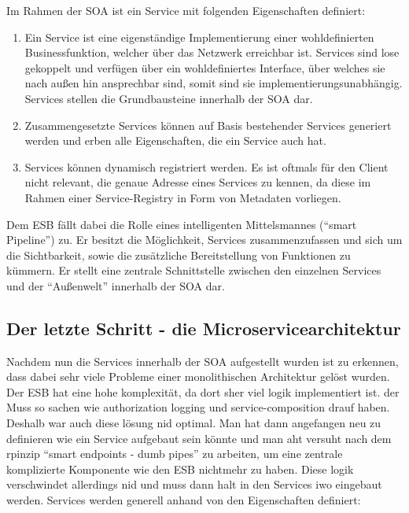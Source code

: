 \begin{definition}
	Im Rahmen der \ac{SOA} ist ein Service mit folgenden Eigenschaften definiert: \autocite[S. 4]{microservice_enterprise}
	\begin{enumerate}
		\item Ein Service ist eine eigenständige Implementierung einer wohldefinierten Businessfunktion, welcher über das Netzwerk erreichbar ist. Services sind lose gekoppelt und verfügen über ein wohldefiniertes Interface, über welches sie nach außen hin ansprechbar sind, somit sind sie implementierungsunabhängig. Services stellen die Grundbausteine innerhalb der \ac{SOA} dar.
		\item Zusammengesetzte Services können auf Basis bestehender Services generiert werden und erben alle Eigenschaften, die ein Service auch hat.
		\item Services können dynamisch registriert werden. Es ist oftmals für den Client nicht relevant, die genaue Adresse eines Services zu kennen, da diese im Rahmen einer Service-Registry in Form von Metadaten vorliegen.
	\end{enumerate}
	Dem \ac{ESB} fällt dabei die Rolle eines intelligenten Mittelsmannes (\enquote{smart Pipeline}) zu. Er besitzt die Möglichkeit, Services zusammenzufassen und sich um die Sichtbarkeit, sowie die zusätzliche Bereitstellung von Funktionen zu kümmern. Er stellt eine zentrale Schnittstelle zwischen den einzelnen Services und der \enquote{Außenwelt} innerhalb der \ac{SOA} dar.
\end{definition}

\subsection{Der letzte Schritt - die Microservicearchitektur}

Nachdem nun die Services innerhalb der \ac{SOA} aufgestellt wurden ist zu erkennen, dass dabei sehr viele Probleme einer monolithischen Architektur gelöst wurden. \autocite{Silveira2016} Der ESB hat eine hohe komplexität, da dort sher viel logik implementiert ist. der Muss so sachen wie authorization logging und service-composition drauf haben. Deshalb war auch diese lösung nid optimal. Man hat dann angefangen neu zu definieren wie ein Service aufgebaut sein könnte und man aht versuht nach dem rpinzip \enquote{smart endpoints - dumb pipes} zu arbeiten, um eine zentrale komplizierte Komponente wie den ESB nichtmehr zu haben. Diese logik verschwindet allerdings nid und muss dann halt in den Services iwo eingebaut werden. Services werden generell anhand von den Eigenschaften definiert:

